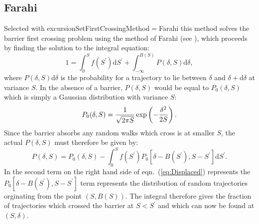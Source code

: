 \subsection{Farahi}

Selected with {\normalfont \ttfamily excursionSetFirstCrossingMethod}$=${\normalfont \ttfamily Farahi} this method solves the barrier first crossing problem using the method of Farahi (see \citealt{benson_dark_2012}), which proceeds by finding the solution to the integral equation:
\begin{equation}
  1 =  \int_0^S f(S^\prime){\mathrm d}S^\prime + \int_{-\infty}^{B(S)} P(\delta,S) {\mathrm d} \delta,
 \label{eq:OldExcursionMethod}
\end{equation}
where $P(\delta,S) {\mathrm d} \delta$ is the probability for a trajectory to lie between $\delta$ and $\delta + {\mathrm d} \delta$ at variance $S$. In the absence of a barrier, $P(\delta,S)$ would be equal to $P_0(\delta,S)$ which is simply a Gaussian distribution with variance $S$:
\begin{equation}
  P_0(\delta,S) = \frac{1}{\sqrt{2 \pi S}} \exp\left(-{\delta^2 \over 2 S}\right).
  \label{eq:Gaussian}
\end{equation}
Since the barrier absorbs any random walks which cross is at smaller $S$, the actual $P(\delta,S)$ must therefore be given by:
\begin{equation}
   P(\delta,S) = P_0(\delta,S) - \int_{0}^{S} f(S^\prime) P_0[\delta - B(S^\prime),S - S^\prime]{\mathrm d}S^\prime .
 \label{eq:Displaced}
\end{equation}
In the second term on the right hand side of eqn.~(\ref{eq:Displaced}) represents the $P_0[\delta - B(S^\prime),S - S^\prime]$ term represents the distribution of random trajectories orginating from the point $(S,B(S))$. The integral therefore gives the fraction of trajectories which crossed the barrier at $S<S^\prime$ and which can now be found at $(S,\delta)$.

